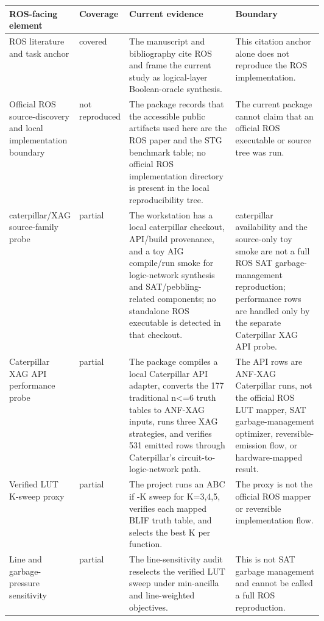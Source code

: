 \begin{tabularx}{\linewidth}{>{\raggedright\arraybackslash}p{0.20\linewidth}>{\raggedright\arraybackslash}p{0.12\linewidth}>{\raggedright\arraybackslash}X>{\raggedright\arraybackslash}p{0.28\linewidth}}
\toprule
ROS-facing element & Coverage & Current evidence & Boundary \\
\midrule
ROS literature and task anchor & covered & The manuscript and bibliography cite ROS and frame the current study as logical-layer Boolean-oracle synthesis. & This citation anchor alone does not reproduce the ROS implementation. \\
Official ROS source-discovery and local implementation boundary & not reproduced & The package records that the accessible public artifacts used here are the ROS paper and the STG benchmark table; no official ROS implementation directory is present in the local reproducibility tree. & The current package cannot claim that an official ROS executable or source tree was run. \\
caterpillar/XAG source-family probe & partial & The workstation has a local caterpillar checkout, API/build provenance, and a toy AIG compile/run smoke for logic-network synthesis and SAT/pebbling-related components; no standalone ROS executable is detected in that checkout. & caterpillar availability and the source-only toy smoke are not a full ROS SAT garbage-management reproduction; performance rows are handled only by the separate Caterpillar XAG API probe. \\
Caterpillar XAG API performance probe & partial & The package compiles a local Caterpillar API adapter, converts the 177 traditional n<=6 truth tables to ANF-XAG inputs, runs three XAG strategies, and verifies 531 emitted rows through Caterpillar's circuit-to-logic-network path. & The API rows are ANF-XAG Caterpillar runs, not the official ROS LUT mapper, SAT garbage-management optimizer, reversible-emission flow, or hardware-mapped result. \\
Verified LUT K-sweep proxy & partial & The project runs an ABC if -K sweep for K=3,4,5, verifies each mapped BLIF truth table, and selects the best K per function. & The proxy is not the official ROS mapper or reversible implementation flow. \\
Line and garbage-pressure sensitivity & partial & The line-sensitivity audit reselects the verified LUT sweep under min-ancilla and line-weighted objectives. & This is not SAT garbage management and cannot be called a full ROS reproduction. \\

\end{tabularx}
